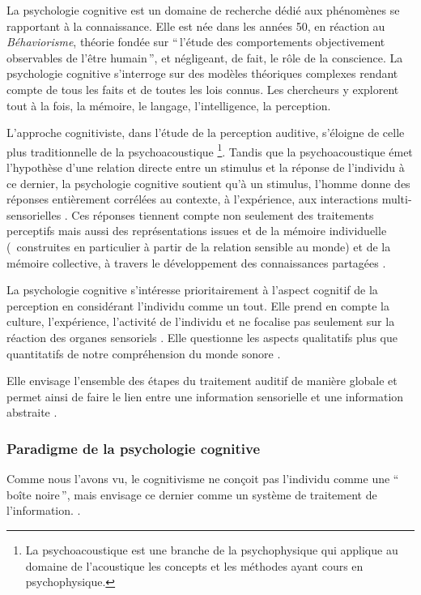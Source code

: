 La psychologie cognitive est un domaine de recherche dédié aux phénomènes se rapportant à la connaissance. Elle est née dans les années 50, en réaction au \emph{Béhaviorisme}, théorie fondée sur ``\,l'étude des comportements objectivement observables de l'être humain\,'', et négligeant, de fait, le rôle de la conscience. La psychologie cognitive s'interroge sur des modèles théoriques complexes rendant compte de tous les faits et de toutes les lois connus. Les chercheurs y explorent tout à la fois, la mémoire, le langage, l'intelligence, la perception.

L'approche cognitiviste, dans l'étude de la perception auditive, s'éloigne de celle plus traditionnelle de la psychoacoustique \footnote{La psychoacoustique est une branche de la psychophysique qui applique au domaine de l'acoustique les concepts et les méthodes ayant cours en psychophysique.}. Tandis que la psychoacoustique émet l'hypothèse d'une relation directe entre un stimulus et la réponse de l'individu à ce dernier, la psychologie cognitive soutient qu'à un stimulus, l'homme donne des réponses entièrement corrélées au contexte, à l'expérience, aux interactions multi-sensorielles \citep{maffiolo_marieParis_1997}. Ces réponses tiennent compte non seulement des traitements perceptifs mais aussi des représentations issues et de la mémoire individuelle (\ie~construites en particulier à partir de la relation sensible au monde) et de la mémoire collective, à travers le développement des connaissances partagées \citep[p. ??]{maffiolo_caracterisation_1999}.

La psychologie cognitive s'intéresse prioritairement à l'aspect cognitif de la perception en considérant l'individu comme un tout. Elle prend en compte la culture, l'expérience, l'activité de l'individu et ne focalise pas seulement sur la réaction des organes sensoriels . Elle questionne les aspects qualitatifs plus que quantitatifs de notre compréhension du monde sonore \citep[p. ??]{maffiolo_caracterisation_1999}.

Elle envisage l'ensemble des étapes du traitement auditif de manière globale et permet ainsi de faire le lien entre une information sensorielle et une information abstraite \citep{mcadams1994penser}.

\subsubsection{Paradigme de la psychologie cognitive}

Comme nous l'avons vu, le cognitivisme ne conçoit pas l'individu comme une ``\,boîte noire\,'', mais envisage ce dernier comme un système de traitement de l'information. .  

